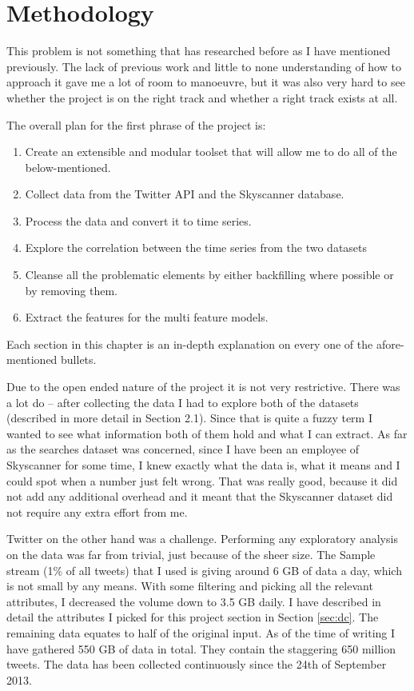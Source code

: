 \documentclass[minf,twoside,singlespacing,parskip,frontabs,notimes,11pt]{infthesis}
\begin{document}
\chapter{Methodology}
\label{chap:method}

This problem is not something that has researched before as I have mentioned previously. The lack of previous work and little to none understanding of how to approach it gave me a lot of room to manoeuvre, but it was also very hard to see whether the project is on the right track and whether a right track exists at all.

The overall plan for the first phrase of the project is:
\begin{enumerate}
\item Create an extensible and modular toolset that will allow me to do all of the below-mentioned.
\item Collect data from the Twitter API and the Skyscanner database. 
\item Process the data and convert it to time series.
\item Explore the correlation between the time series from the two datasets
\item Cleanse all the problematic elements by either backfilling where possible or by removing them.
\item Extract the features for the multi feature models.
\end{enumerate}

Each section in this chapter is an in-depth explanation on every one of the afore-mentioned bullets. 

Due to the open ended nature of the project it is not very restrictive. There was a lot do -- after collecting the data I had to explore both of the datasets (described in more detail in Section 2.1). Since that is quite a fuzzy term I wanted to see what information both of them hold and what I can extract. As far as the searches dataset was concerned, since I have been an employee of Skyscanner for some time, I knew exactly what the data is, what it means and I could spot when a number just felt wrong. That was really good, because it did not add any additional overhead and it meant that the Skyscanner dataset did not require any extra effort from me. 


Twitter on the other hand was a challenge. Performing any exploratory analysis on the data was far from trivial, just because of the sheer size. The Sample stream (1\% of all tweets) \cite{samplestream} that I used is giving around 6 GB of data a day, which is not small by any means. With some filtering and picking all the relevant attributes, I decreased the volume down to 3.5 GB daily. I have described in detail the attributes I picked for this project section in Section \ref{sec:dc}. The remaining data equates to half of the original input. As of the time of writing I have gathered 550 GB of data in total. They contain the staggering 650 million tweets. The data has been collected continuously since the 24th of September 2013. 
\end{document}
